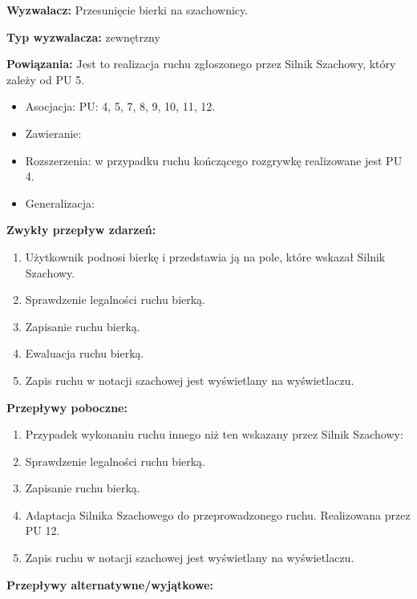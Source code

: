 \documentclass[12pt]{article}
\begin{document}
\textbf{Wyzwalacz:} Przesunięcie bierki na szachownicy.

\textbf{Typ wyzwalacza:} zewnętrzny

\textbf{Powiązania:} Jest to realizacja ruchu zgłoszonego przez Silnik Szachowy, który zależy od PU 5.
	\begin{itemize}
	\item Asocjacja: PU: 4, 5, 7, 8, 9, 10, 11, 12.
	\item Zawieranie: 
	\item Rozszerzenia: w przypadku ruchu kończącego rozgrywkę realizowane jest PU 4.
	\item Generalizacja: 
\end{itemize} 

\textbf{Zwykły przepływ zdarzeń:}  
\begin{enumerate}
\item Użytkownik podnosi bierkę i przedstawia ją na pole, które wskazał Silnik Szachowy.
\item Sprawdzenie legalności ruchu bierką.
\item Zapisanie ruchu bierką.
\item Ewaluacja ruchu bierką.
\item Zapis ruchu w notacji szachowej jest wyświetlany na wyświetlaczu.
\end{enumerate} 

\textbf{Przepływy poboczne:}
\begin{enumerate}
\item Przypadek wykonaniu ruchu innego niż ten wskazany przez Silnik Szachowy:
\item Sprawdzenie legalności ruchu bierką.
\item Zapisanie ruchu bierką.
\item Adaptacja Silnika Szachowego do przeprowadzonego ruchu. Realizowana przez PU 12.
\item Zapis ruchu w notacji szachowej jest wyświetlany na wyświetlaczu.
\end{enumerate}

\textbf{Przepływy alternatywne/wyjątkowe:}
\end{document}

